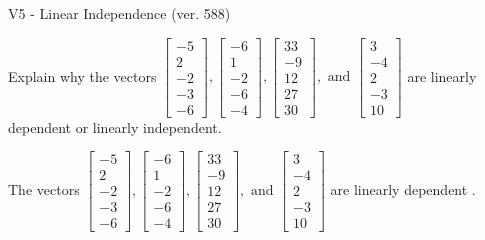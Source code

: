 \begin{exercise}
  \begin{exerciseTitle}V5 - Linear Independence (ver. 588)\end{exerciseTitle}
  \begin{exerciseStatement}
    Explain why the vectors \(\left[\begin{array}{r}
-5 \\
2 \\
-2 \\
-3 \\
-6
\end{array}\right] , \left[\begin{array}{r}
-6 \\
1 \\
-2 \\
-6 \\
-4
\end{array}\right] , \left[\begin{array}{r}
33 \\
-9 \\
12 \\
27 \\
30
\end{array}\right] , \text{ and } \left[\begin{array}{r}
3 \\
-4 \\
2 \\
-3 \\
10
\end{array}\right]\) are linearly dependent or linearly independent.	


  \end{exerciseStatement}
  \begin{exerciseAnswer}
   The vectors \(\left[\begin{array}{r}
-5 \\
2 \\
-2 \\
-3 \\
-6
\end{array}\right] , \left[\begin{array}{r}
-6 \\
1 \\
-2 \\
-6 \\
-4
\end{array}\right] , \left[\begin{array}{r}
33 \\
-9 \\
12 \\
27 \\
30
\end{array}\right] , \text{ and } \left[\begin{array}{r}
3 \\
-4 \\
2 \\
-3 \\
10
\end{array}\right]\) are 
  	 linearly dependent  .
  


  \end{exerciseAnswer}
\end{exercise}